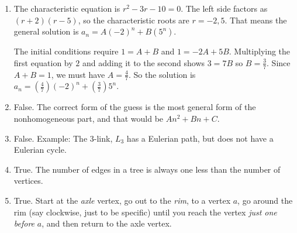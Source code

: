 \documentclass[11pt]{amsart}
\begin{document}
\begin{enumerate}
\medskip

\item The characteristic equation is $r^2 -3r-10 = 0$. The left side factors as $(r+2)(r-5)$, so the characteristic
roots are $r = -2, 5$. That means the general solution is $a_n = A(-2)^n + B(5^n)$.

The initial conditions require  $1 = A + B$  and $1 = -2A + 5B$. Multiplying the first equation by $2$ and adding
it to the second shows $3 = 7B$ so $\displaystyle B = \frac{3}{7}$. Since $A+B=1$, we must have 
$\displaystyle A= \frac{4}{7}$.
So the solution is $\displaystyle a_n = \left(\frac{4}{7}\right)(-2)^n + \left(\frac{3}{7}\right)5^n$. 

\medskip

\item False. The correct form of the guess is the most general form of the nonhomogeneous part, and that would be
$An^2+Bn+C$.

\medskip

\item False. Example: The $3$-link, $L_{3}$ has a Eulerian path, but does not have a Eulerian cycle.

\medskip 

\item True. The number of edges in a tree is always one less than the number of vertices.
 
\medskip

\item True. Start at the {\it axle} vertex, go out to the {\it rim}, to a vertex $a$, go around the rim
(say clockwise, just to be specific) until you reach the vertex {\it just one before} $a$, and then return
to the axle vertex.


\end{enumerate}
\end{document}
